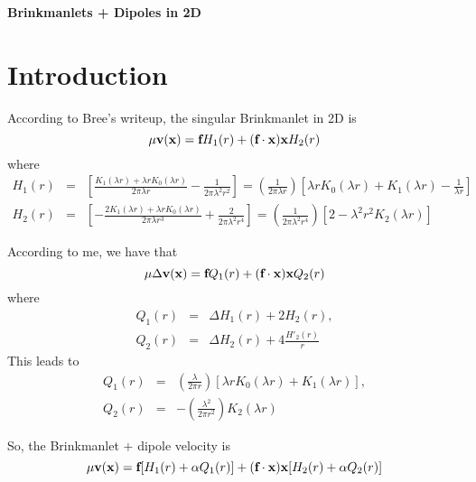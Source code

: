 \documentclass[12pt]{article}
\newcommand{\bx}{\mbox{\bf x}}
\newcommand{\bv}{\mbox{\bf v}}
\newcommand{\ff}{\mbox{\bf f}}
\begin{document}
\begin{center}
{\bf\large  Brinkmanlets + Dipoles in 2D}
\end{center}


\section{Introduction}
According to Bree's writeup, the singular Brinkmanlet in 2D is
\begin{equation}
\mu \bv(\bx) = \ff H_1(r) + (\ff\cdot\bx)\bx H_2(r)
\end{equation}
where
\begin{eqnarray}
H_1(r) &=&  \left[ \frac{K_1(\lambda r) + \lambda r K_0(\lambda r)}{2\pi \lambda r} - \frac{1}{2\pi\lambda^2 r^2}\right]
= \left( \frac{1}{2\pi\lambda r} \right) \left[ \lambda r K_0(\lambda r) + K_1(\lambda r) - \frac{1}{\lambda r} \right] \\
H_2(r) &=& \left[ -\frac{2K_1(\lambda r) + \lambda r K_0(\lambda r)}{2\pi \lambda r^3} + \frac{2}{2\pi\lambda^2 r^4}\right]
= \left( \frac{1}{2\pi\lambda^2 r^4} \right) \left[ 2- \lambda^2 r^2 K_2(\lambda r)  \right]
\end{eqnarray}

According to me, we have that 
\[
\mu\Delta\bv(\bx) = \ff Q_1(r) + (\ff\cdot\bx)\bx Q_2(r)
\]
where
\begin{eqnarray}
Q_1(r) &=&  \Delta H_1(r) + 2 H_2(r), \\
Q_2(r) &=& \Delta H_2(r) + 4 \frac{H'_2(r)}{r}
\end{eqnarray}
This leads to
\begin{eqnarray}
Q_1(r) &=&  \left(\frac{\lambda}{2\pi r}\right) \left[ \lambda r K_0(\lambda r) +  K_1(\lambda r) \right], \\
Q_2(r) &=& -\left(\frac{\lambda^2}{2\pi r^2}\right)  K_2(\lambda r) 
\end{eqnarray}

So, the Brinkmanlet $+$ dipole velocity is
\[
\mu\bv(\bx) = \ff [ H_1(r) + \alpha Q_1(r)] + (\ff\cdot\bx)\bx [H_2(r) + \alpha Q_2(r)]
\]
\end{document}
